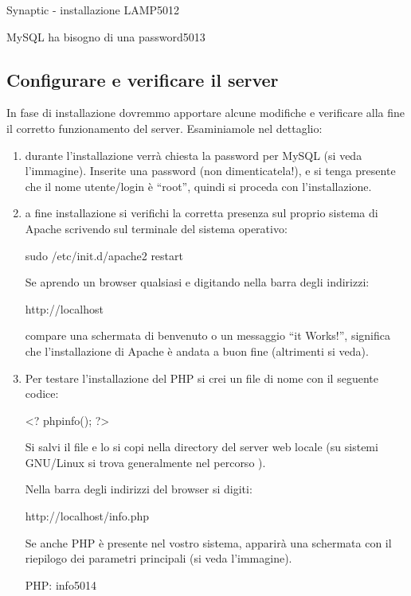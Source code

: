 \begin{img}{Synaptic - installazione LAMP}{5}{012}
\end{img}


\begin{img}{MySQL ha bisogno di una password}{5}{013}
\end{img}

\subsection{Configurare e verificare il server}
In fase di installazione dovremmo apportare alcune modifiche e verificare alla fine il corretto funzionamento del server. Esaminiamole nel dettaglio:

\begin{enumerate}
\item durante l'installazione verrà chiesta la password per MySQL (si veda l'immagine). Inserite una password (non dimenticatela!), e si tenga presente che il nome utente/login è ``root'', quindi si proceda con l'installazione.
\item a fine installazione si verifichi la corretta presenza sul proprio sistema di Apache scrivendo sul terminale del sistema operativo:

\begin{code}
sudo /etc/init.d/apache2 restart
\end{code}

Se aprendo un browser qualsiasi e digitando nella barra degli indirizzi:

\begin{code}
http://localhost
\end{code}

compare una schermata di benvenuto o un messaggio ``it Works!'', significa che l'installazione di Apache è andata a buon fine (altrimenti si veda).

\item Per testare l'installazione del \ac{PHP} si crei un file di nome  con il seguente codice:

\begin{code}
<?
	phpinfo();
?>
\end{code}

Si salvi il file e lo si copi nella directory del server web locale (su sistemi GNU/Linux si trova generalmente nel percorso ).

Nella barra degli indirizzi del browser si digiti:

\begin{code}
http://localhost/info.php
\end{code}

Se anche \ac{PHP} è presente nel vostro sistema, apparirà una schermata con il riepilogo dei parametri principali (si veda l'immagine).

\begin{img}{PHP: info}{5}{014}
\end{img}

\end{enumerate}

